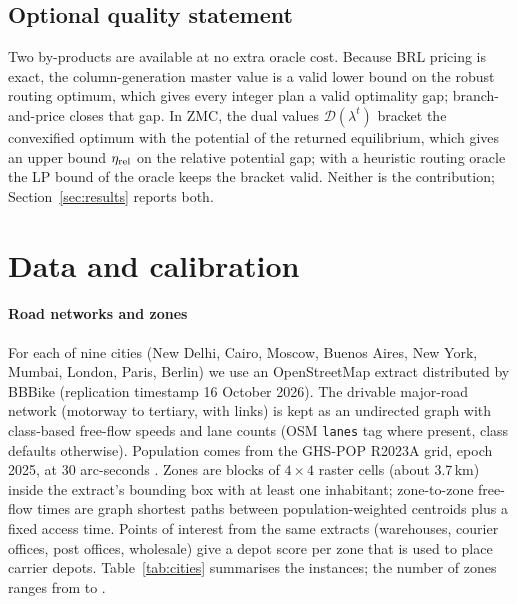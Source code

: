 \documentclass[preprint,12pt]{elsarticle}
\theoremstyle{definition}
\theoremstyle{remark}
\begin{document}
\subsection{Optional quality statement}\label{sec:addon}

Two by-products are available at no extra oracle cost. Because BRL pricing is exact, the column-generation master value is a valid lower bound on the robust routing optimum, which gives every integer plan a valid optimality gap; branch-and-price closes that gap. In ZMC, the dual values $\mathcal D(\lambda^t)$ bracket the convexified optimum with the potential of the returned equilibrium, which gives an upper bound $\eta_{\rm rel}$ on the relative potential gap; with a heuristic routing oracle the LP bound of the oracle keeps the bracket valid. Neither is the contribution; Section~\ref{sec:results} reports both.

\section{Data and calibration}\label{sec:data}

\paragraph{Road networks and zones} For each of nine cities (New Delhi, Cairo, Moscow, Buenos Aires, New York, Mumbai, London, Paris, Berlin) we use an OpenStreetMap extract \citep{Haklay2008} distributed by BBBike (replication timestamp 16 October 2026). The drivable major-road network (motorway to tertiary, with links) is kept as an undirected graph with class-based free-flow speeds and lane counts (OSM \texttt{lanes} tag where present, class defaults otherwise). Population comes from the GHS-POP R2023A grid, epoch 2025, at 30 arc-seconds \citep{GHSPOP2023}. Zones are blocks of $4\times4$ raster cells (about 3.7\,km) inside the extract's bounding box with at least one inhabitant; zone-to-zone free-flow times are graph shortest paths between population-weighted centroids plus a fixed access time. Points of interest from the same extracts (warehouses, courier offices, post offices, wholesale) give a depot score per zone that is used to place carrier depots. Table~\ref{tab:cities} summarises the instances; the number of zones ranges from \Zmin{} to \Zmax.

\begin{table}[t]\centering\small
\caption{City instances. $Z$: zones; population from GHS-POP inside the zones; major road and lane kilometres inside the zones; nodes of the major-road graph; $N$: number of carriers.}\label{tab:cities}
\end{table}
\end{document}
